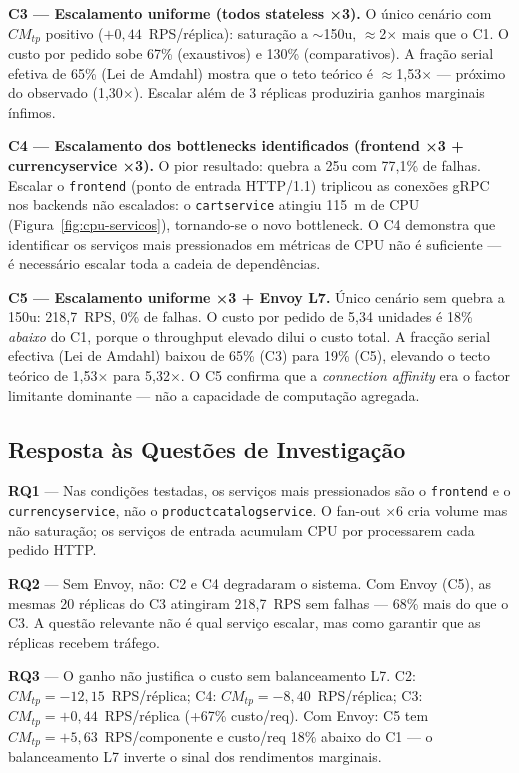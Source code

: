 \documentclass[acmsmall,screen=true,nonacm]{acmart}
\begin{document}
\textbf{C3 — Escalamento uniforme (todos stateless ×3).} O único cenário com $CM_{tp}$ positivo ($+0{,}44$~RPS/réplica): saturação a $\sim$150u, $\approx$2$\times$ mais que o C1. O custo por pedido sobe 67\% (exaustivos) e 130\% (comparativos). A fração serial efetiva de 65\% (Lei de Amdahl) mostra que o teto teórico é $\approx$1,53$\times$ — próximo do observado (1,30$\times$). Escalar além de 3 réplicas produziria ganhos marginais ínfimos.

\textbf{C4 — Escalamento dos bottlenecks identificados (frontend ×3 + currencyservice ×3).} O pior resultado: quebra a 25u com 77,1\% de falhas. Escalar o \texttt{frontend} (ponto de entrada HTTP/1.1) triplicou as conexões gRPC nos backends não escalados: o \texttt{cartservice} atingiu 115~m de CPU (Figura~\ref{fig:cpu-servicos}), tornando-se o novo bottleneck. O C4 demonstra que identificar os serviços mais pressionados em métricas de CPU não é suficiente — é necessário escalar toda a cadeia de dependências.

\textbf{C5 — Escalamento uniforme ×3 + Envoy L7.} Único cenário sem quebra a 150u: 218,7~RPS, 0\% de falhas. O custo por pedido de 5,34 unidades é 18\% \emph{abaixo} do C1, porque o throughput elevado dilui o custo total. A fracção serial efectiva (Lei de Amdahl) baixou de 65\% (C3) para 19\% (C5), elevando o tecto teórico de 1,53$\times$ para 5,32$\times$. O C5 confirma que a \textit{connection affinity} era o factor limitante dominante — não a capacidade de computação agregada.

\subsection{Resposta às Questões de Investigação}

\textbf{RQ1} — Nas condições testadas, os serviços mais pressionados são o \texttt{frontend} e o \texttt{currencyservice}, não o \texttt{productcatalogservice}. O fan-out ×6 cria volume mas não saturação; os serviços de entrada acumulam CPU por processarem cada pedido HTTP.

\textbf{RQ2} — Sem Envoy, não: C2 e C4 degradaram o sistema. Com Envoy (C5), as mesmas 20 réplicas do C3 atingiram 218,7~RPS sem falhas — 68\% mais do que o C3. A questão relevante não é qual serviço escalar, mas como garantir que as réplicas recebem tráfego.

\textbf{RQ3} — O ganho não justifica o custo sem balanceamento L7. C2: $CM_{tp}=-12{,}15$~RPS/réplica; C4: $CM_{tp}=-8{,}40$~RPS/réplica; C3: $CM_{tp}=+0{,}44$~RPS/réplica (+67\% custo/req). Com Envoy: C5 tem $CM_{tp}=+5{,}63$~RPS/componente e custo/req 18\% abaixo do C1 — o balanceamento L7 inverte o sinal dos rendimentos marginais.
\end{document}
